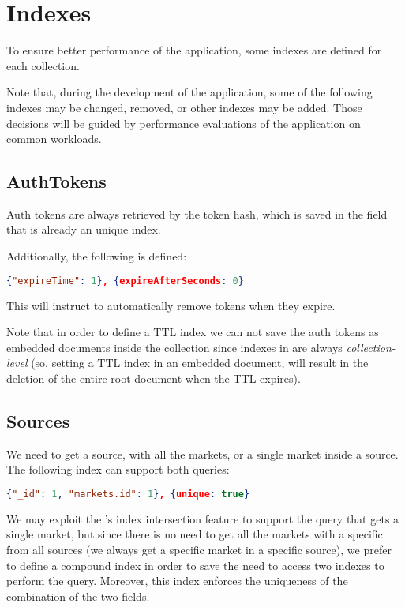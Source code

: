 \section{Indexes}\label{sec:indexes}

To ensure better performance of the application, some indexes are defined for
each collection.

Note that, during the development of the application, some of the following
indexes may be changed, removed, or other indexes may be added. Those decisions
will be guided by performance evaluations of the application on common
workloads.

\subsection{AuthTokens}

Auth tokens are always retrieved by the token hash, which is saved in the
 field that is already an unique index.

Additionally, the following  is defined:

\begin{lstlisting}[language=json]
{"expireTime": 1}, {expireAfterSeconds: 0}
\end{lstlisting}

This will instruct \mongodb{} to automatically remove tokens when they expire.

Note that in order to define a TTL index we can not save the auth tokens as
embedded documents inside the  collection since indexes in
\mongodb{} are always \emph{collection-level} (so, setting a TTL index in an
embedded document, will result in the deletion of the entire root document when
the TTL expires).

\subsection{Sources}

We need to get a source, with all the markets, or a single market inside a
source. The following  index can support both queries:

\begin{lstlisting}[language=json]
{"_id": 1, "markets.id": 1}, {unique: true}
\end{lstlisting}

We may exploit the \mongodb's index intersection feature to support the query
that gets a single market, but since there is no need to get all the markets
with a specific  from all sources (we always get a specific market in a
specific source), we prefer to define a compound index in order to save
\mongodb{} the need to access two indexes to perform the query. Moreover, this
index enforces the uniqueness of the combination of the two fields.


